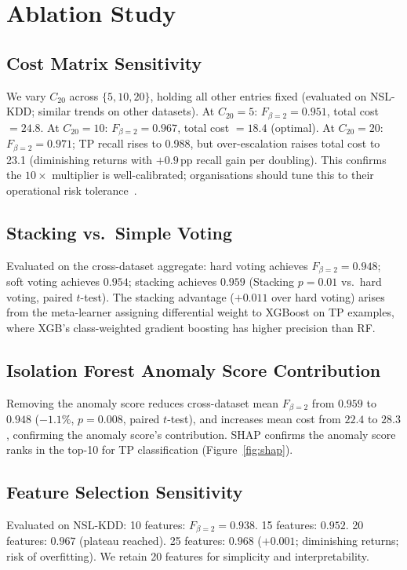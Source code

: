 \documentclass[conference]{IEEEtran}
\begin{document}
\section{Ablation Study}
\label{sec:ablation}

\subsection{Cost Matrix Sensitivity}
We vary $C_{20}$ across $\{5, 10, 20\}$, holding all other entries fixed
(evaluated on NSL-KDD; similar trends on other datasets).
At $C_{20}=5$: $F_{\beta=2}=0.951$, total cost $=24.8$.
At $C_{20}=10$: $F_{\beta=2}=0.967$, total cost $=18.4$ (optimal).
At $C_{20}=20$: $F_{\beta=2}=0.971$; TP recall rises to 0.988, but over-escalation raises
total cost to 23.1 (diminishing returns with $+0.9$\,pp recall gain per doubling).
This confirms the $10\times$ multiplier is well-calibrated; organisations should tune
this to their operational risk tolerance~\cite{elkan2001}.

\subsection{Stacking vs.\ Simple Voting}
Evaluated on the cross-dataset aggregate:
hard voting achieves $F_{\beta=2}=0.948$; soft voting achieves $0.954$; stacking achieves
$0.959$ (Stacking $p=0.01$ vs.\ hard voting, paired $t$-test).
The stacking advantage ($+0.011$ over hard voting) arises from the meta-learner assigning
differential weight to XGBoost on TP examples, where XGB's class-weighted gradient boosting
has higher precision than RF.

\subsection{Isolation Forest Anomaly Score Contribution}
Removing the anomaly score reduces cross-dataset mean $F_{\beta=2}$ from $0.959$ to
$0.948$ ($-1.1\%$, $p=0.008$, paired $t$-test), and increases mean cost from $22.4$ to
$28.3$, confirming the anomaly score's contribution.
SHAP confirms the anomaly score ranks in the top-10 for TP classification (Figure~\ref{fig:shap}).

\subsection{Feature Selection Sensitivity}
Evaluated on NSL-KDD:
10 features: $F_{\beta=2}=0.938$.
15 features: $0.952$.
20 features: $0.967$ (plateau reached).
25 features: $0.968$ ($+0.001$; diminishing returns; risk of overfitting).
We retain 20 features for simplicity and interpretability.
\end{document}

